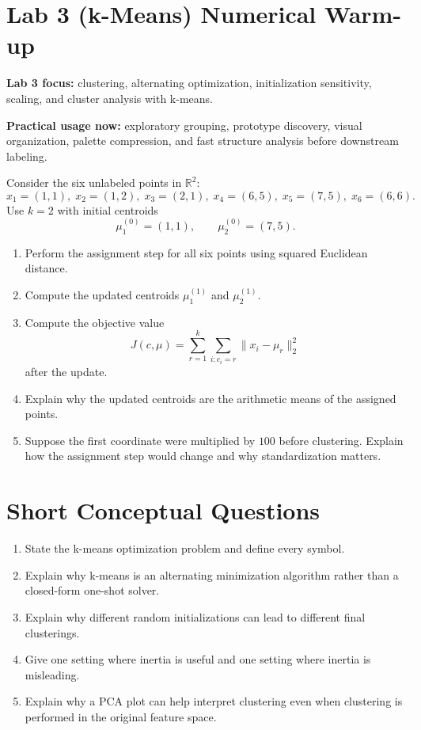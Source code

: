 \section*{Lab 3 (k-Means) Numerical Warm-up}
\textbf{Lab 3 focus:} clustering, alternating optimization, initialization sensitivity, scaling, and cluster analysis with k-means.

\medskip
\textbf{Practical usage now:} exploratory grouping, prototype discovery, visual organization, palette compression, and fast structure analysis before downstream labeling.

\medskip
Consider the six unlabeled points in $\mathbb{R}^2$:
\[
  x_1=(1,1),\;
  x_2=(1,2),\;
  x_3=(2,1),\;
  x_4=(6,5),\;
  x_5=(7,5),\;
  x_6=(6,6).
\]
Use $k=2$ with initial centroids
\[
  \mu_1^{(0)}=(1,1),\qquad \mu_2^{(0)}=(7,5).
\]

\begin{enumerate}[label=\textbf{W\arabic*.}]
  \item Perform the assignment step for all six points using squared Euclidean distance.
  \item Compute the updated centroids $\mu_1^{(1)}$ and $\mu_2^{(1)}$.
  \item Compute the objective value
  \[
    J(c,\mu)=\sum_{r=1}^{k}\sum_{i:c_i=r}\|x_i-\mu_r\|_2^2
  \]
  after the update.
  \item Explain why the updated centroids are the arithmetic means of the assigned points.
  \item Suppose the first coordinate were multiplied by $100$ before clustering. Explain how the assignment step would change and why standardization matters.
\end{enumerate}

\section*{Short Conceptual Questions}
\begin{enumerate}[label=\textbf{C\arabic*.}]
  \item State the k-means optimization problem and define every symbol.
  \item Explain why k-means is an alternating minimization algorithm rather than a closed-form one-shot solver.
  \item Explain why different random initializations can lead to different final clusterings.
  \item Give one setting where inertia is useful and one setting where inertia is misleading.
  \item Explain why a PCA plot can help interpret clustering even when clustering is performed in the original feature space.
\end{enumerate}


